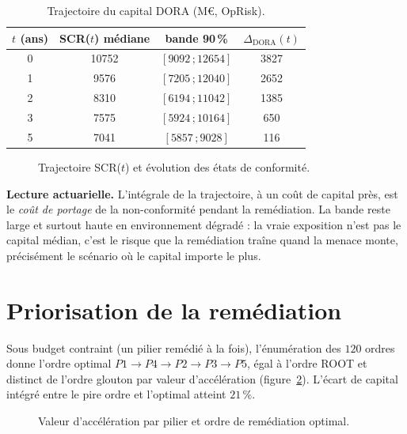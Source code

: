 \begin{table}[htbp]\centering\small
\renewcommand{\arraystretch}{1.2}
\begin{tabular}{@{}c ccc@{}}
\toprule
$t$ (ans) & SCR($t$) médiane & bande 90\,\% & $\Delta_{\text{DORA}}(t)$ \\
\midrule
0 & 10752 & $[9092\,;12654]$ & 3827 \\
1 & 9576  & $[7205\,;12040]$ & 2652 \\
2 & 8310  & $[6194\,;11042]$ & 1385 \\
3 & 7575  & $[5924\,;10164]$ & 650 \\
5 & 7041  & $[5857\,;9028]$  & 116 \\
\bottomrule
\end{tabular}
\caption{Trajectoire du capital DORA (M\euro, OpRisk).}
\label{tab:traj}
\end{table}

\begin{figure}[htbp]\centering
{}
\caption{Trajectoire SCR($t$) et évolution des états de conformité.}
\label{fig:traj}
\end{figure}

\noindent \textbf{Lecture actuarielle.} L'intégrale de la trajectoire, à un coût de capital
près, est le \emph{coût de portage} de la non-conformité pendant la remédiation. La bande reste
large et surtout haute en environnement dégradé : la vraie exposition n'est pas le capital
médian, c'est le risque que la remédiation traîne quand la menace monte, précisément le scénario
où le capital importe le plus.

\section{Priorisation de la remédiation}
\label{sec:res-prio}

Sous budget contraint (un pilier remédié à la fois), l'énumération des $120$ ordres donne
l'ordre optimal $P1\to P4\to P2\to P3\to P5$, égal à l'ordre ROOT et distinct de l'ordre
glouton par valeur d'accélération (figure~\ref{fig:prio}). L'écart de capital intégré entre le
pire ordre et l'optimal atteint $21\,\%$.

\begin{figure}[htbp]\centering
{}
\caption{Valeur d'accélération par pilier et ordre de remédiation optimal.}
\label{fig:prio}
\end{figure}

